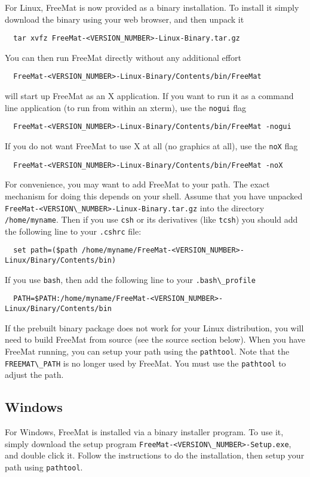 For Linux, FreeMat is now provided as a binary installation.  To install it
simply download the binary using your web browser, and then unpack it
\begin{verbatim}
  tar xvfz FreeMat-<VERSION_NUMBER>-Linux-Binary.tar.gz
\end{verbatim}
You can then run FreeMat directly without any additional effort
\begin{verbatim}
  FreeMat-<VERSION_NUMBER>-Linux-Binary/Contents/bin/FreeMat
\end{verbatim}
will start up FreeMat as an X application.  If you want to run it
as a command line application (to run from within an xterm), use
the \verb|nogui| flag
\begin{verbatim}
  FreeMat-<VERSION_NUMBER>-Linux-Binary/Contents/bin/FreeMat -nogui
\end{verbatim}
If you do not want FreeMat to use X at all (no graphics at all), use
the \verb|noX| flag
\begin{verbatim}
  FreeMat-<VERSION_NUMBER>-Linux-Binary/Contents/bin/FreeMat -noX
\end{verbatim}
For convenience, you may want to add FreeMat to your path.  The exact
mechanism for doing this depends on your shell.  Assume that you have
unpacked \verb|FreeMat-<VERSION\_NUMBER>-Linux-Binary.tar.gz| into the directory
\verb|/home/myname|.  Then if you use \verb|csh| or its derivatives (like \verb|tcsh|)
you should add the following line to your \verb|.cshrc| file:
\begin{verbatim}
  set path=($path /home/myname/FreeMat-<VERSION_NUMBER>-Linux/Binary/Contents/bin)
\end{verbatim}
If you use \verb|bash|, then add the following line to your \verb|.bash\_profile|
\begin{verbatim}
  PATH=$PATH:/home/myname/FreeMat-<VERSION_NUMBER>-Linux/Binary/Contents/bin
\end{verbatim}
If the prebuilt binary package does not work for your Linux distribution, you
will need to build FreeMat from source (see the source section below).  When
you have FreeMat running, you can setup your path using the \verb|pathtool|.  Note
that the \verb|FREEMAT\_PATH| is no longer used by FreeMat.  You must use the \verb|pathtool|
to adjust the path.
\subsection{Windows}

For Windows, FreeMat is installed via a binary installer program.  To use it,
simply download the setup program \verb|FreeMat-<VERSION\_NUMBER>-Setup.exe|, and double
click it.  Follow the instructions to do the installation, then setup your path
using \verb|pathtool|.
